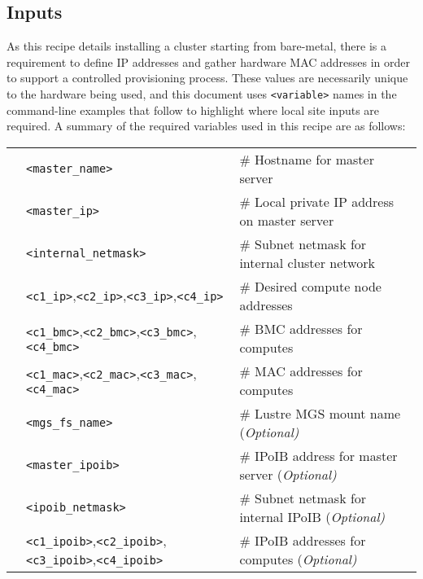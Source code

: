 \subsection{Inputs}
As this recipe details installing a cluster
starting from bare-metal, there is a requirement to define IP addresses and gather
hardware MAC addresses in order to support a controlled provisioning process. These values
are necessarily unique to the hardware being used, and this document uses \texttt{<variable>}
names in the command-line examples that follow to highlight where local site
inputs are required. A summary of the required variables used in this recipe
are as follows: \\

\vspace*{0.2cm}
\begin{tabular}{@{}>{\textbullet}cll@{}}
& \texttt{<master\_name>}  & {\small \# Hostname for master server} \\
& \texttt{<master\_ip>} & {\small \# Local private IP address on master server} \\
& \texttt{<internal\_netmask>} & {\small \# Subnet netmask for internal cluster network} \\
& \texttt{<c1\_ip>},\texttt{<c2\_ip>},\texttt{<c3\_ip>},\texttt{<c4\_ip>}
& {\small \# Desired compute node addresses} \\
& \texttt{<c1\_bmc>},\texttt{<c2\_bmc>},\texttt{<c3\_bmc>},\texttt{<c4\_bmc>}
& {\small \# BMC addresses for computes} \\
& \texttt{<c1\_mac>},\texttt{<c2\_mac>},\texttt{<c3\_mac>},\texttt{<c4\_mac>}
& {\small \# MAC addresses for computes} \\
& \texttt{<mgs\_fs\_name>} & {\small \# Lustre MGS mount name (\em Optional)} \\
& \texttt{<master\_ipoib>} & {\small \# IPoIB address for master server (\em Optional)} \\
& \texttt{<ipoib\_netmask>} & {\small \# Subnet netmask for internal IPoIB (\em Optional)} \\
& \texttt{<c1\_ipoib>},\texttt{<c2\_ipoib>},\texttt{<c3\_ipoib>},\texttt{<c4\_ipoib>}
& {\small \# IPoIB addresses for computes (\em Optional)}\\

\end{tabular}
